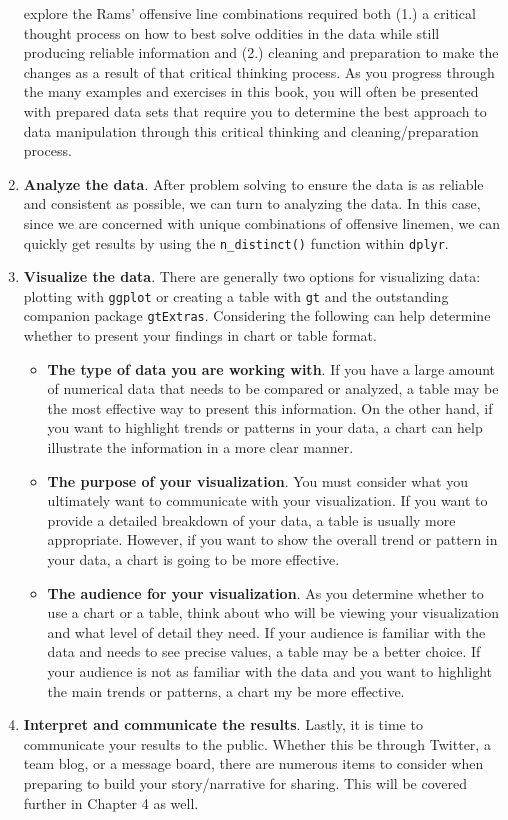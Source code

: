 \documentclass[
  letterpaper,
]{krantz}
\begin{document}
\begin{enumerate}
  explore the Rams' offensive line combinations required both (1.) a
  critical thought process on how to best solve oddities in the data
  while still producing reliable information and (2.) cleaning and
  preparation to make the changes as a result of that critical thinking
  process. As you progress through the many examples and exercises in
  this book, you will often be presented with prepared data sets that
  require you to determine the best approach to data manipulation
  through this critical thinking and cleaning/preparation process.
\item
  \textbf{Analyze the data}. After problem solving to ensure the data is
  as reliable and consistent as possible, we can turn to analyzing the
  data. In this case, since we are concerned with unique combinations of
  offensive linemen, we can quickly get results by using the
  \texttt{n\_distinct()} function within \texttt{dplyr}.
\item
  \textbf{Visualize the data}. There are generally two options for
  visualizing data: plotting with \texttt{ggplot} or creating a table
  with \texttt{gt} and the outstanding companion package
  \texttt{gtExtras}. Considering the following can help determine
  whether to present your findings in chart or table format.

  \begin{itemize}
  \item
    \textbf{The type of data you are working with}. If you have a large
    amount of numerical data that needs to be compared or analyzed, a
    table may be the most effective way to present this information. On
    the other hand, if you want to highlight trends or patterns in your
    data, a chart can help illustrate the information in a more clear
    manner.
  \item
    \textbf{The purpose of your visualization}. You must consider what
    you ultimately want to communicate with your visualization. If you
    want to provide a detailed breakdown of your data, a table is
    usually more appropriate. However, if you want to show the overall
    trend or pattern in your data, a chart is going to be more
    effective.
  \item
    \textbf{The audience for your visualization}. As you determine
    whether to use a chart or a table, think about who will be viewing
    your visualization and what level of detail they need. If your
    audience is familiar with the data and needs to see precise values,
    a table may be a better choice. If your audience is not as familiar
    with the data and you want to highlight the main trends or patterns,
    a chart my be more effective.
  \end{itemize}
\item
  \textbf{Interpret and communicate the results}. Lastly, it is time to
  communicate your results to the public. Whether this be through
  Twitter, a team blog, or a message board, there are numerous items to
  consider when preparing to build your story/narrative for sharing.
  This will be covered further in Chapter 4 as well.
\end{enumerate}
\end{document}
